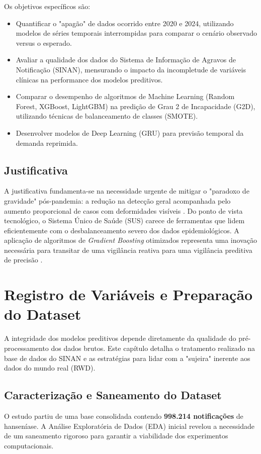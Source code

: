 \documentclass[12pt, a4paper]{report}
\begin{document}
Os objetivos específicos são:
\begin{itemize}
    \item Quantificar o "apagão" de dados ocorrido entre 2020 e 2024, utilizando modelos de séries temporais interrompidas para comparar o cenário observado versus o esperado.
    \item Avaliar a qualidade dos dados do Sistema de Informação de Agravos de Notificação (SINAN), mensurando o impacto da incompletude de variáveis clínicas na performance dos modelos preditivos.
    \item Comparar o desempenho de algoritmos de Machine Learning (Random Forest, XGBoost, LightGBM) na predição de Grau 2 de Incapacidade (G2D), utilizando técnicas de balanceamento de classes (SMOTE).
    \item Desenvolver modelos de Deep Learning (GRU) para previsão temporal da demanda reprimida.
\end{itemize}

\section{Justificativa}
A justificativa fundamenta-se na necessidade urgente de mitigar o "paradoxo de gravidade" pós-pandemia: a redução na detecção geral acompanhada pelo aumento proporcional de casos com deformidades visíveis \citep{matos2025time, vidal2024impact}. Do ponto de vista tecnológico, o Sistema Único de Saúde (SUS) carece de ferramentas que lidem eficientemente com o desbalanceamento severo dos dados epidemiológicos. A aplicação de algoritmos de \textit{Gradient Boosting} otimizados representa uma inovação necessária para transitar de uma vigilância reativa para uma vigilância preditiva de precisão \citep{freitas2025evaluating, hairani2024addressing}.

\chapter{Registro de Variáveis e Preparação do Dataset}

A integridade dos modelos preditivos depende diretamente da qualidade do pré-processamento dos dados brutos. Este capítulo detalha o tratamento realizado na base de dados do SINAN e as estratégias para lidar com a "sujeira" inerente aos dados do mundo real (RWD).

\section{Caracterização e Saneamento do Dataset}
O estudo partiu de uma base consolidada contendo \textbf{998.214 notificações} de hanseníase. A Análise Exploratória de Dados (EDA) inicial revelou a necessidade de um saneamento rigoroso para garantir a viabilidade dos experimentos computacionais.
\end{document}
